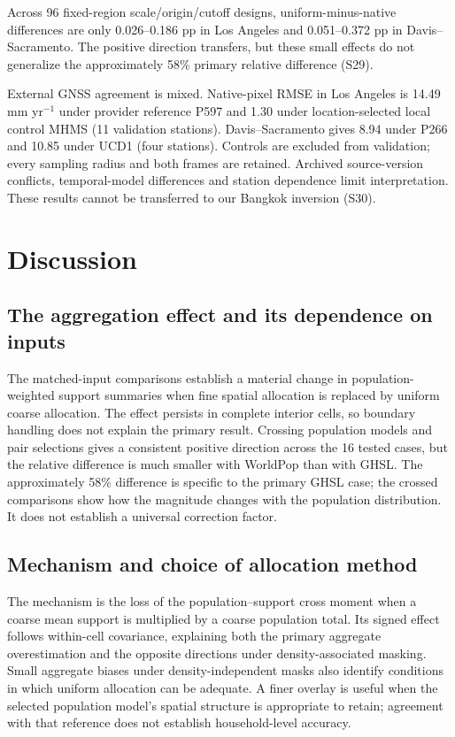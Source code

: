 \documentclass[pdflatex,sn-nature]{sn-jnl}
\begin{document}
Across 96 fixed-region scale/origin/cutoff designs, uniform-minus-native differences are only 0.026--0.186 pp in Los Angeles and 0.051--0.372 pp in Davis--Sacramento. The positive direction transfers, but these small effects do not generalize the approximately 58\% primary relative difference (S29).

External GNSS agreement is mixed. Native-pixel RMSE in Los Angeles is 14.49 mm yr$^{-1}$ under provider reference P597 and 1.30 under location-selected local control MHMS (11 validation stations). Davis--Sacramento gives 8.94 under P266 and 10.85 under UCD1 (four stations). Controls are excluded from validation; every sampling radius and both frames are retained. Archived source-version conflicts, temporal-model differences and station dependence limit interpretation. These results cannot be transferred to our Bangkok inversion (S30).

\FloatBarrier
\section{Discussion}
\subsection{The aggregation effect and its dependence on inputs}
The matched-input comparisons establish a material change in population-weighted support summaries when fine spatial allocation is replaced by uniform coarse allocation. The effect persists in complete interior cells, so boundary handling does not explain the primary result. Crossing population models and pair selections gives a consistent positive direction across the 16 tested cases, but the relative difference is much smaller with WorldPop than with GHSL. The approximately 58\% difference is specific to the primary GHSL case; the crossed comparisons show how the magnitude changes with the population distribution. It does not establish a universal correction factor.

\subsection{Mechanism and choice of allocation method}
The mechanism is the loss of the population--support cross moment when a coarse mean support is multiplied by a coarse population total. Its signed effect follows within-cell covariance, explaining both the primary aggregate overestimation and the opposite directions under density-associated masking. Small aggregate biases under density-independent masks also identify conditions in which uniform allocation can be adequate. A finer overlay is useful when the selected population model's spatial structure is appropriate to retain; agreement with that reference does not establish household-level accuracy.
\end{document}
